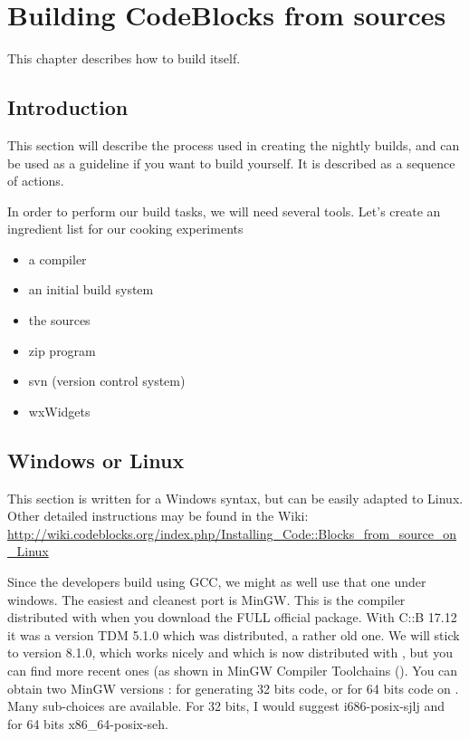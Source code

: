 \chapter{Building CodeBlocks from sources}\label{sec:build_codeblocks}

This chapter describes how to build \codeblocks itself.


\section{Introduction}

This section will describe the process used in creating the nightly builds, and can be used as a guideline if you want to build \codeblocks yourself. It is described as a sequence of actions.

In order to perform our build tasks, we will need several tools. Let's create an ingredient list for our cooking experiments

\begin{itemize}
\item a compiler
\item an initial build system
\item the \codeblocks sources
\item zip program
\item svn (version control system)
\item wxWidgets
\end{itemize}

\section{Windows or Linux}

This section is written for a Windows syntax, but can be easily adapted to Linux. 
Other detailed instructions may be found in the Wiki: \url{ http://wiki.codeblocks.org/index.php/Installing_Code::Blocks_from_source_on_Linux}

Since the \codeblocks developers build \codeblocks using GCC, we might as well use that one under windows. The easiest and cleanest port is MinGW. This is the compiler distributed with \codeblocks when you download the FULL official package. With C::B 17.12 it was a version TDM 5.1.0 which was distributed, a rather old one. We will stick to version 8.1.0, which works nicely and which is now distributed with , but you can find more recent ones (as shown in MinGW Compiler Toolchains (). You can obtain two MinGW versions : for generating 32 bits code, or for 64 bits code on \cite{url:mingw64}. Many sub-choices are available. For 32 bits, I would suggest i686-posix-sjlj and for 64 bits x86\_64-posix-seh.

